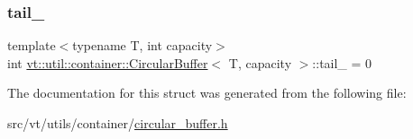 \mbox{\label{structvt_1_1util_1_1container_1_1_circular_buffer_a5eb4acef245cc1a7a455a9ef99f1f4b4}} 
\subsubsection{\texorpdfstring{tail\+\_\+}{tail\_}}
{\footnotesize\ttfamily template$<$typename T, int capacity$>$ \\
int \hyperlink{structvt_1_1util_1_1container_1_1_circular_buffer}{vt\+::util\+::container\+::\+Circular\+Buffer}$<$ T, capacity $>$\+::tail\+\_\+ = 0\hspace{0.3cm}{\ttfamily [private]}}



The documentation for this struct was generated from the following file\+:\begin{DoxyCompactItemize}
\item 
src/vt/utils/container/\hyperlink{circular__buffer_8h}{circular\+\_\+buffer.\+h}\end{DoxyCompactItemize}
